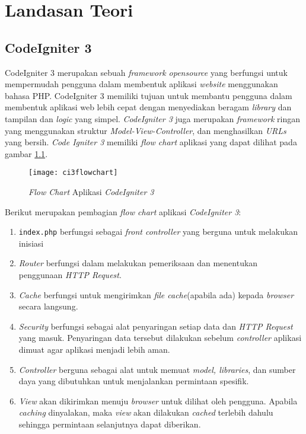 \chapter{Landasan Teori}
\label{chap:teori}

\section{CodeIgniter 3\cite{ci3:22}}
\label{sec:ci3} 
 
CodeIgniter 3 merupakan sebuah \textit{framework opensource} yang berfungsi untuk mempermudah pengguna dalam membentuk aplikasi \textit{website} menggunakan bahasa PHP. CodeIgniter 3 memiliki tujuan untuk membantu pengguna dalam membentuk aplikasi web lebih cepat dengan menyediakan beragam \textit{library} dan tampilan dan \textit{logic} yang simpel. \textit{CodeIgniter 3} juga merupakan \textit{framework} ringan yang menggunakan struktur \textit{Model-View-Controller}, dan menghasilkan \textit{URLs} yang bersih. \textit{Code Igniter 3} memiliki \textit{flow chart} aplikasi yang dapat dilihat pada gambar \ref{fig:ci3flowchart}.

\begin{figure}[H]
	\centering  
	\texttt{[image: ci3flowchart]}  
	\caption[\textit{Flow Chart} Aplikasi \textit{CodeIgniter 3}]{\textit{Flow Chart} Aplikasi \textit{CodeIgniter 3}} 
	\label{fig:ci3flowchart} 
\end{figure} 

Berikut merupakan pembagian \textit{flow chart} aplikasi \textit{CodeIgniter 3}:
\begin{enumerate}
\item \texttt{index.php} berfungsi sebagai \textit{front controller} yang berguna untuk melakukan inisiasi
\item \textit{Router} berfungsi dalam melakukan pemeriksaan dan menentukan penggunaan \textit{HTTP Request}.
\item \textit{Cache} berfungsi untuk mengirimkan \textit{file cache}(apabila ada) kepada \textit{browser} secara langsung.   
\item \textit{Security} berfungsi sebagai alat penyaringan setiap data dan \textit{HTTP Request} yang masuk. Penyaringan data tersebut dilakukan sebelum \textit{controller} aplikasi dimuat agar aplikasi menjadi lebih aman.
\item \textit{Controller} berguna sebagai alat untuk memuat \textit{model, libraries}, dan sumber daya yang dibutuhkan untuk menjalankan permintaan spesifik.
\item \textit{View} akan dikirimkan menuju \textit{browser} untuk dilihat oleh pengguna. Apabila \textit{caching} dinyalakan, maka \textit{view} akan dilakukan \textit{cached} terlebih dahulu sehingga permintaan selanjutnya dapat diberikan.
\end{enumerate}

